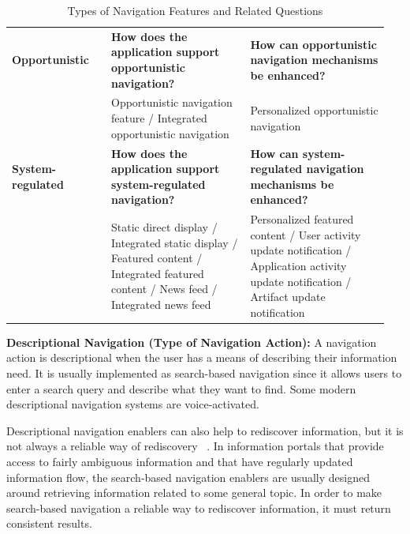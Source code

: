 \documentclass[review]{elsarticle}
\newcommand{\feature}[1]{{\ttfamily#1}}
\begin{document}
{{\begin{table}[!htbp]
\begin{tabular}{|p{0.25\linewidth}| p{0.35\linewidth}| p{0.35\linewidth}|}
\textbf{Opportunistic}          & \textbf{How does the application support opportunistic navigation?}& \textbf{How can opportunistic navigation mechanisms be enhanced?}\\
& Opportunistic navigation feature / Integrated opportunistic navigation & Personalized opportunistic navigation \\
\textbf{System-regulated}       &\textbf{How does the application support system-regulated navigation?} & \textbf{How can system-regulated navigation mechanisms be enhanced?}\\
& Static direct display / Integrated static display / Featured content / Integrated featured content / News feed / Integrated news feed & Personalized featured content / User activity update notification / Application activity update notification / Artifact update notification \\
    
\hline
\end{tabular}
\caption{Types of Navigation Features and Related Questions}
\label{table:framework_navigation} 
\end{table}

\textbf{Descriptional Navigation (Type of Navigation Action):} A navigation action is descriptional when the user has a means of describing their information need. It is usually implemented as \feature{search-based navigation} since it allows users to enter a search query and describe what they want to find.  
Some modern descriptional navigation systems are voice-activated.  
%

Descriptional navigation enablers can also help to rediscover information, but it is not always a reliable way of rediscovery ~\cite{cockburn2003improving}. In information portals that provide access to fairly ambiguous information and that have regularly updated information flow, the search-based navigation enablers are usually designed around retrieving information related to some general topic. In order to make search-based navigation a reliable way to rediscover information, it must return consistent results. 
} %


}
\end{document}
